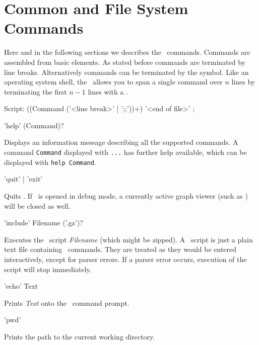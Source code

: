 \section{Common and File System Commands}
\label{commcommands}

Here and in the following sections we describes the \GrShell\ commands.
Commands are assembled from basic elements.
As stated before commands are terminated by line breaks.
Alternatively commands can be terminated by the \indexed{\texttt{;;}} symbol.
Like an operating system shell, the \GrShell\ allows you to span a single command over $n$ lines by terminating the first $n-1$ lines with a .
\begin{rail}
  Script: ((Command ('<line break>' | ';;'))+) '<end of file>' ;
\end{rail}

\begin{rail}
  'help' (Command)?
\end{rail}
Displays an information message describing all the supported commands.
A command \texttt{Command} displayed with \texttt{...} has further help available, which can be displayed with \texttt{help Command}.

\begin{rail}
  'quit' | 'exit'
\end{rail}
Quits \GrShell. If \GrShell\ is opened in debug mode, a currently active graph viewer (such as \yComp) will be closed as well.

\begin{rail}
  'include' Filename ('.gz')?
\end{rail}
Executes the \GrShell\ script \emph{Filename} (which might be zipped).
A \GrShell\ script is just a plain text file containing \GrShell\ commands.
They are treated as they would be entered interactively, except for parser errors.
If a parser error occurs, execution of the script will stop immediately.

\begin{rail}
  'echo' Text
\end{rail}
Prints \emph{Text} onto the \GrShell\ command prompt.

\begin{rail}
  'pwd'
\end{rail}
Prints the path to the current working directory.

